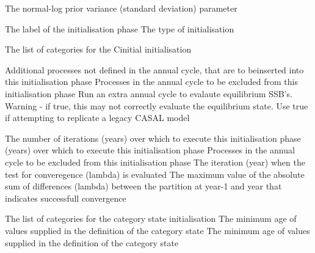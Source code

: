  {The normal-log prior variance (standard deviation) parameter}
\par\textbf{}\par
\par\textbf{}\par
{}\par\par
{} {The label of the initialisation phase}
 {The type of initialisation}
\par\textbf{}\par
{} {The list of categories for the Cinitial initialisation}
\par\textbf{}\par
{} {Additional processes not defined in the annual cycle, that are to beinserted into this initialisation phase}
 {Processes in the annual cycle to be excluded from this initialisation phase}
 {Run an extra annual cycle to evalaute equilibrium SSB's. Warning - if true, this may not correctly evaluate the equilibrium state. Use true if attempting to replicate a legacy CASAL model}
\par\textbf{}\par
{} {The number of iterations (years) over which to execute this initialisation phase}
 {(years) over which to execute this initialisation phase}
 {Processes in the annual cycle to be excluded from this initialisation phase}
 {The iteration (year) when the test for converegence (lambda) is evaluated}
 {The maximum value of the absolute sum of differences (lambda) between the partition at year-1 and year that indicates successfull convergence}
\par\textbf{}\par
{} {The list of categories for the category state initialisation}
 {The minimum age of values supplied in the definition of the category state}
 {The minimum age of values supplied in the definition of the category state}

